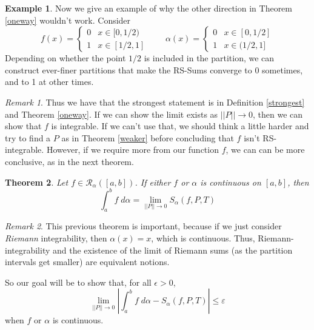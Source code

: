 \documentclass[12pt]{article}
\theoremstyle{plain}
\newtheorem{thm}{Theorem}[subsection]
\theoremstyle{definition}
\newtheorem{ex}[thm]{Example}
\theoremstyle{remark}
\newtheorem*{rmk}{Remark}
\begin{document}
\begin{ex}
Now we give an example of why the other direction in Theorem \ref{oneway} wouldn't work.  Consider
\[ f(x) = \begin{cases} 0 & x \in [0, 1/2) \\ 1 & x \in [1/2, 1] 
        \end{cases}  \qquad
    \alpha(x) = \begin{cases} 0 & x \in [0,1/2] \\ 1& x\in(1/2, 1] 
        \end{cases} \]
Depending on whether the point $1/2$ is included in the partition, we can construct ever-finer partitions that make the RS-Sums converge to 0 sometimes, and to 1 at other times.
\end{ex}
\begin{rmk}
    Thus we have that the strongest statement is in Definition \ref{strongest} and Theorem \ref{oneway}. If we can show the limit exists as $||P||\rightarrow 0$, then we can show that $f$ is integrable. If we can't use that, we should think a little harder and try to find a $P$ as in Theorem \ref{weaker} before concluding that $f$ isn't RS-integrable. However, if we require more from our function $f$, we can can be more conclusive, as in the next theorem.
\end{rmk}

\begin{thm}
Let $f\in\mathscr{R}_\alpha([a,b])$. If either $f$ or $\alpha$ is continuous on $[a,b]$, then 
\begin{equation}
    \label{limsum.toprove}
    \int^b_a f\;d\alpha = \lim_{||P||\rightarrow 0} 
    S_\alpha(f,P,T) 
\end{equation}
\end{thm}
\begin{rmk}
This previous theorem is important, because if we just consider \emph{Riemann} integrability, then $\alpha(x) = x$, which is continuous. Thus, Riemann-integrability and the existence of the limit of Riemann sums (as the partition intervals get smaller) are equivalent notions.
\end{rmk}
So our goal will be to show that, for all $\epsilon>0$,
\begin{equation}
    \label{contequiv.toshow}
    \lim_{||P||\rightarrow 0}
    \left\lvert \int^b_a f \; d\alpha - S_\alpha(f,P,T) \right\rvert
        \leq \varepsilon
\end{equation}
when $f$ or $\alpha$ is continuous.
\end{document}
